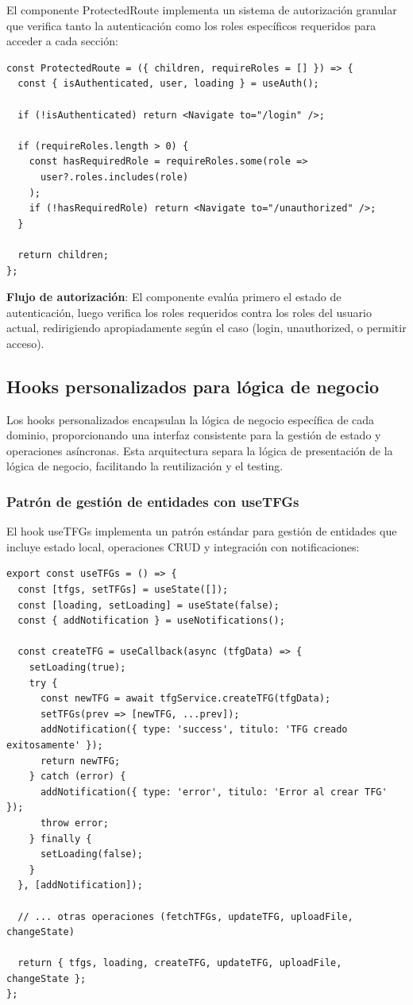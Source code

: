 \documentclass[12pt,a4paper,oneside]{report}
\begin{document}
El componente ProtectedRoute implementa un sistema de autorización granular que verifica tanto la autenticación como los roles específicos requeridos para acceder a cada sección:

\begin{lstlisting}
const ProtectedRoute = ({ children, requireRoles = [] }) => {
  const { isAuthenticated, user, loading } = useAuth();

  if (!isAuthenticated) return <Navigate to="/login" />;

  if (requireRoles.length > 0) {
    const hasRequiredRole = requireRoles.some(role =>
      user?.roles.includes(role)
    );
    if (!hasRequiredRole) return <Navigate to="/unauthorized" />;
  }

  return children;
};
\end{lstlisting}

\textbf{Flujo de autorización}: El componente evalúa primero el estado de autenticación, luego verifica los roles requeridos contra los roles del usuario actual, redirigiendo apropiadamente según el caso (login, unauthorized, o permitir acceso).

\subsection{Hooks personalizados para lógica de negocio}\label{implementaciuxf3n-de-hooks-personalizados}

Los hooks personalizados encapsulan la lógica de negocio específica de cada dominio, proporcionando una interfaz consistente para la gestión de estado y operaciones asíncronas. Esta arquitectura separa la lógica de presentación de la lógica de negocio, facilitando la reutilización y el testing.

\subsubsection{Patrón de gestión de entidades con useTFGs}\label{usetfgs-hook}

El hook useTFGs implementa un patrón estándar para gestión de entidades que incluye estado local, operaciones CRUD y integración con notificaciones:

\begin{lstlisting}
export const useTFGs = () => {
  const [tfgs, setTFGs] = useState([]);
  const [loading, setLoading] = useState(false);
  const { addNotification } = useNotifications();

  const createTFG = useCallback(async (tfgData) => {
    setLoading(true);
    try {
      const newTFG = await tfgService.createTFG(tfgData);
      setTFGs(prev => [newTFG, ...prev]);
      addNotification({ type: 'success', titulo: 'TFG creado exitosamente' });
      return newTFG;
    } catch (error) {
      addNotification({ type: 'error', titulo: 'Error al crear TFG' });
      throw error;
    } finally {
      setLoading(false);
    }
  }, [addNotification]);

  // ... otras operaciones (fetchTFGs, updateTFG, uploadFile, changeState)

  return { tfgs, loading, createTFG, updateTFG, uploadFile, changeState };
};
\end{lstlisting}
\end{document}
